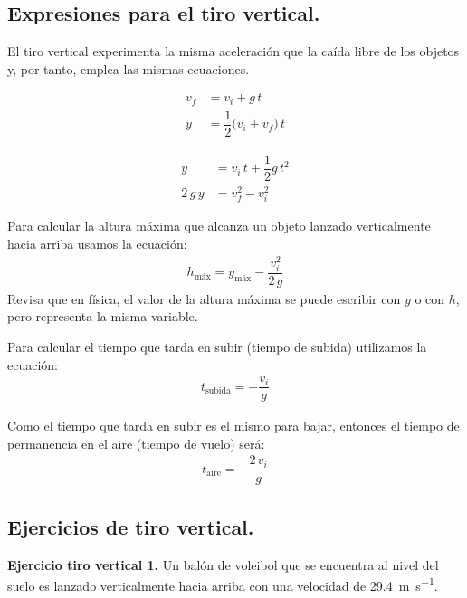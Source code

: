 \documentclass[14pt]{extarticle}
\begin{document}
\subsection{Expresiones para el tiro vertical.}

El tiro vertical experimenta la misma aceleración que la caída libre de los objetos y, por tanto, emplea las mismas ecuaciones.

\begin{minipage}{0.4\linewidth}
\begin{align*}
v_{f} &= v_{i} + g \, t \\[0.5em]
y &= \dfrac{1}{2} \big( v_{i} + v_{f} \big) \, t
\end{align*}
\end{minipage}
\hspace{1cm}
\begin{minipage}{0.4\linewidth}
\begin{align*}
y &= v_{i} \, t + \dfrac{1}{2} g \, t^{2} \\[0.5em]
2 \, g \, y &= v_{f}^{2} - v_{i}^{2} 
\end{align*}
\end{minipage}   

\vspace*{0.5cm}
Para calcular la altura máxima que alcanza un objeto lanzado verticalmente hacia arriba usamos la ecuación:
\begin{align*}
h_{\text{máx}} = y_{\text{máx}} - \dfrac{v_{i}^{2}}{2 \, g}
\end{align*}
Revisa que en física, el valor de la altura máxima se puede escribir con $y$ o con $h$, pero representa la misma variable.

Para calcular el tiempo que tarda en subir (tiempo de subida) utilizamos la ecuación:
\begin{align*}
t_{\text{subida}} = - \dfrac{v_{i}}{g}
\end{align*}

Como el tiempo que tarda en subir es el mismo para bajar, entonces el tiempo de permanencia en el aire (tiempo de vuelo) será:
\begin{align*}
t_{\text{aire}} = - \dfrac{2 \, v_{i}}{g}
\end{align*}    

\subsection{Ejercicios de tiro vertical.}

\textbf{Ejercicio tiro vertical 1. } Un balón de voleibol que se encuentra al nivel del suelo es lanzado verticalmente hacia arriba con una velocidad de \SI{29.4}{\meter\per\second}.
\end{document}
